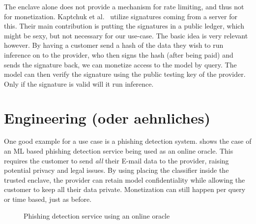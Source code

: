 \documentclass[11pt,twocolumn]{article}
\newcommand{\mail}{E-mail}
\begin{document}
The enclave alone does not provide a mechanism for rate limiting, and thus not for monetization.
Kaptchuk et al.~\cite{kaptchuk_giving_nodate} utilize signatures coming from a server for this.
Their main contribution is putting the signatures in a public ledger, which might be sexy, but not necessary for our use-case.
The basic idea is very relevant however.
By having a customer send a hash of the data they wish to run inference on to the provider, who then signs the hash (after being paid) and sends the signature back, we can monetize access to the model by query.
The model can then verify the signature using the public testing key of the provider.
Only if the signature is valid will it run inference.

\section{Engineering (oder aehnliches)}
\label{sec:engineering}

One good example for a use case is a phishing detection system.
 shows the case of an ML based phishing detection service being used as an online oracle.
This requires the customer to send \emph{all} their \mail{} data to the provider, raising potential privacy and legal issues.
By using placing the classifier inside the trusted enclave, the provider can retain model confidentiality while allowing the customer to keep all their data private.
Monetization can still happen per query or time based, just as before.

\begin{figure}[h]
    \centering
    \caption{Phishing detection service using an online oracle}
    \label{fig:online-phishing}
\end{figure}
\end{document}
